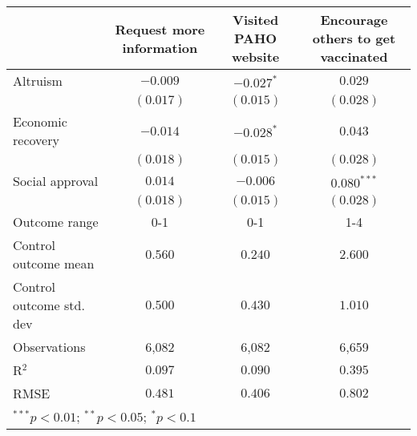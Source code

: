 \begin{table}
\begin{center}
\begin{tabular}{l c c c}
\hline
 & Request more information & Visited PAHO website & Encourage others to get vaccinated \\
\hline
Altruism                 & $-0.009$  & $-0.027^{*}$ & $0.029$       \\
                         & $(0.017)$ & $(0.015)$    & $(0.028)$     \\
Economic recovery        & $-0.014$  & $-0.028^{*}$ & $0.043$       \\
                         & $(0.018)$ & $(0.015)$    & $(0.028)$     \\
Social approval          & $0.014$   & $-0.006$     & $0.080^{***}$ \\
                         & $(0.018)$ & $(0.015)$    & $(0.028)$     \\
\hline
Outcome range            & 0-1       & 0-1          & 1-4           \\
Control outcome mean     & $0.560$   & $0.240$      & $2.600$       \\
Control outcome std. dev & $0.500$   & $0.430$      & $1.010$       \\
Observations             & 6,082     & 6,082        & 6,659         \\
R$^{2}$                  & $0.097$   & $0.090$      & $0.395$       \\
RMSE                     & $0.481$   & $0.406$      & $0.802$       \\
\hline
\multicolumn{4}{l}{\scriptsize{$^{***}p<0.01$; $^{**}p<0.05$; $^{*}p<0.1$}}
\end{tabular}
\caption{}
\label{table:Tables and Figures/SI_table23_motiv_behav_pooled}
\end{center}
\end{table}
